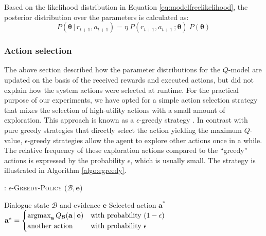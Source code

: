 Based on the likelihood distribution in Equation \eqref{eq:modelfreelikelihood}, the posterior distribution over the parameters is calculated as: 
\begin{equation}
P(\boldsymbol\theta \, | \, r_{t+1}, a_{t+1}) = \eta \ P(r_{t+1}, a_{t+1} \,; \boldsymbol\theta)  \ P(\boldsymbol\theta)  \label{eq:posteriormodelfree}
\end{equation}


\subsubsection*{Action selection}

The above section described how the parameter distributions for the $Q$-model are updated on the basis of the received rewards and executed actions, but did not explain how the system actions were selected at runtime.  For the practical purpose of our experiments, we have opted for a simple action selection strategy that mixes the selection of high-utility actions with a small amount of exploration.  This approach is known as a $\epsilon$-greedy strategy \citep{citeulike:112017}.  In contrast with pure greedy strategies that directly select the action yielding the maximum $Q$-value, $\epsilon$-greedy strategies allow the agent to explore other actions once in a while. The relative frequency of these exploration actions compared to the  ``greedy'' actions is expressed by the probability $\epsilon$, which is usually small. The strategy is illustrated in Algorithm \ref{algo:egreedy}.


\begin{algorithm}[h!]
\caption{: \textsc{$\epsilon$-Greedy-Policy} ($\mathcal{B}, \mathbf{e}$)}
\begin{algorithmic}[1] \vspace{1mm}
\REQUIRE Dialogue state $\mathcal{B}$ and evidence $\mathbf{e}$
\ENSURE Selected action $\mathbf{a}^*$
\RETURN $\mathbf{a}^* = \begin{cases} \argmax_{\mathbf{a}} Q_{\mathcal{B}}(\mathbf{a} \, | \, \mathbf{e}) & \text{with probability } (1- \epsilon) \\ \text{another action} & \text{with probability } \epsilon \end{cases}$
\end{algorithmic}
\label{algo:egreedy}
\end{algorithm}

